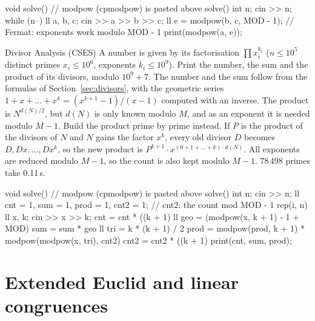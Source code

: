 \begin{code}
void solve() {  // modpow (cpmodpow) is pasted above solve()
    int n;
    cin >> n;
    while (n--) {
        ll a, b, c;
        cin >> a >> b >> c;
        ll e = modpow(b, c, MOD - 1);  // Fermat: exponents work modulo MOD - 1
        print(modpow(a, e));
    }
}
\end{code}

\begin{problem}{Divisor Analysis (CSES)}
A number is given by its factorisation $\prod x_i^{k_i}$ ($n \le 10^5$ distinct primes $x_i \le 10^6$, exponents $k_i \le 10^9$).
Print the number, the sum and the product of its divisors, modulo $10^9 + 7$.
\solution The number and the sum follow from the formulas of Section~\ref{sec:divisors}, with the geometric series $1 + x + \dots + x^k
= (x^{k+1} - 1)/(x - 1)$ computed with an inverse. The product is $N^{d(N)/2}$, but $d(N)$ is only known modulo $M$, and as an
exponent it is needed modulo $M - 1$. Build the product prime by prime instead. If $P$ is the product of the divisors of $N$ and $N$
gains the factor $x^k$, every old divisor $D$ becomes $D, Dx, \dots, Dx^k$, so the new product is $P^{k+1} \cdot x^{(0 + 1 + \dots + k)
\cdot d(N)}$. All exponents are reduced modulo $M - 1$, so the count is also kept modulo $M - 1$. 78\,498 primes take 0.11\,s.
\end{problem}

\begin{code}
void solve() {  // modpow (cpmodpow) is pasted above solve()
    int n;
    cin >> n;
    ll cnt = 1, sum = 1, prod = 1, cnt2 = 1;  // cnt2: the count mod MOD - 1
    rep(i, n) {
        ll x, k;
        cin >> x >> k;
        cnt = cnt * ((k + 1) %
        ll geo = (modpow(x, k + 1) - 1 + MOD) %
        sum = sum * geo %
        ll tri = k * (k + 1) / 2 %
        prod = modpow(prod, k + 1) * modpow(modpow(x, tri), cnt2) %
        cnt2 = cnt2 * ((k + 1) %
    }
    print(cnt, sum, prod);
}
\end{code}

\section[Extended Euclid and linear congruences]{Extended Euclid and linear congruences \hfill \gold}\label{sec:extgcd}

